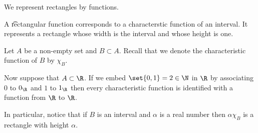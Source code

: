 

We represent rectangles by functions.


A \t{rectangular function} corresponds to a characterstic function of an interval.
It represents a rectangle whose width is the interval and whose height is one.


Let $A$ be a non-empty set and $B \subset A$.
Recall that we denote the characteristic function of $B$ by $\chi _{B}$.

Now suppose that $A \subset \R $.
If we embed $\set{0, 1} = 2 \in \N $ in $\R $ by associating $0$ to $0_{\R }$ and $1$ to $1_{\R }$ then every characteristic function is identified with a function from $\R $ to $\R $.

In particular, notice that if $B$ is an interval and $\alpha $ is a real number then $\alpha  \chi _{B}$ is a rectangle with height $\alpha $.

\blankpage
